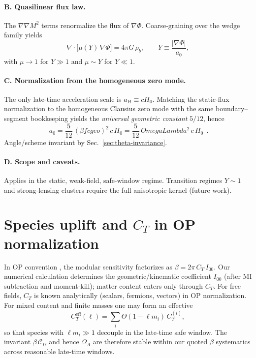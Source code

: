 \documentclass[aps,prd,onecolumn,superscriptaddress,nofootinbib]{revtex4-2}
\def\OmL{OmegaLambda}%
\def\cgeo{cgeo}%
\def\boxed#1{#1}%
\newcommand{\OmL}{\Omega_\Lambda}
\newcommand{\cgeo}{c_{\rm geo}}
\begin{document}
\paragraph*{B. Quasilinear flux law.}
The $\nabla\nabla M^2$ terms renormalize the flux of $\nabla\Phi$. Coarse-graining over the wedge family yields
\begin{equation}
\nabla\!\cdot\!\big[\mu(Y)\,\nabla\Phi\big] = 4\pi G\,\rho_b, \qquad
Y \equiv \frac{|\nabla\Phi|}{a_0},
\end{equation}
with $\mu\to 1$ for $Y\gg 1$ and $\mu\sim Y$ for $Y\ll 1$.

\paragraph*{C. Normalization from the homogeneous zero mode.}
The only late-time acceleration scale is $a_H\equiv cH_0$. Matching the static-flux normalization to the homogeneous Clausius zero mode with the same boundary--segment bookkeeping yields the \emph{universal geometric constant} $5/12$, hence
\begin{equation}
\boxed{\ a_0 = \frac{5}{12}\,(\beta f \cgeo)^2\,c\,H_0 = \frac{5}{12}\,\OmL^2\,c\,H_0\ }\ .
\end{equation}
Angle/scheme invariant by Sec.~\ref{sec:theta-invariance}.

\paragraph*{D. Scope and caveats.}
Applies in the static, weak-field, safe-window regime. Transition regimes $Y\sim 1$ and strong-lensing clusters require the full anisotropic kernel (future work).

\section{Species uplift and \(C_T\) in OP normalization}
\label{app:species}
In OP convention \cite{OsbornPetkou1994}, the modular sensitivity factorizes as \(\beta=2\pi\,C_T\,I_{00}\). Our numerical calculation determines the geometric/kinematic coefficient \(I_{00}\) (after MI subtraction and moment-kill); matter content enters only through \(C_T\). For free fields, \(C_T\) is known analytically (scalars, fermions, vectors) in OP normalization. For mixed content and finite masses one may form an effective
\[
C_T^{\mathrm{eff}}(\ell)=\sum_i \Theta(1-\ell m_i)\,C_T^{(i)},
\]
so that species with \(\ell m_i\gg 1\) decouple in the late-time safe window. The invariant \(\beta\,\mathcal C_\Omega\) and hence \(\Omega_\Lambda\) are therefore stable within our quoted \(\beta\) systematics across reasonable late-time windows.
\end{document}
